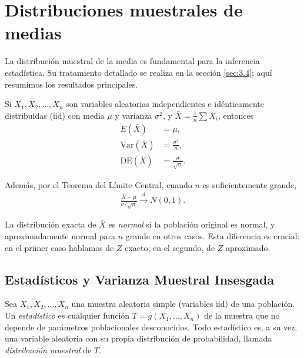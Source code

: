 \section{Distribuciones muestrales de medias}

La distribuci\'on muestral de la media es fundamental para la inferencia estad\'istica.
Su tratamiento detallado se realiza en la secci\'on \ref{sec:3.4}; aqu\'i resumimos
los resultados principales.

Si $X_1, X_2, \ldots, X_n$ son variables aleatorias independientes e id\'enticamente
distribuidas (iid) con media $\mu$ y varianza $\sigma^2$, y $\bar{X} = \frac{1}{n}\sum X_i$,
entonces
\begin{align}
 \label{eq:3.2.7}
 E(\bar{X}) &= \mu, \\
 \label{eq:3.2.8}
 \text{Var}(\bar{X}) &= \frac{\sigma^2}{n}, \\
 \label{eq:3.2.9}
 \text{DE}(\bar{X}) &= \frac{\sigma}{\sqrt{n}}.
\end{align}

Adem\'as, por el Teorema del L\'imite Central, cuando $n$ es suficientemente grande,
\begin{align}
 \label{eq:3.2.10}
 \frac{\bar{X} - \mu}{\sigma/\sqrt{n}} \xrightarrow{d} N(0,1).
\end{align}

\begin{observacion}
La distribuci\'on exacta de $\bar{X}$ es \emph{normal} si la poblaci\'on original es
normal, y aproximadamente normal para $n$ grande en otros casos. Esta diferencia es
crucial: en el primer caso hablamos de $Z$ exacto; en el segundo, de $Z$ aproximado.
\end{observacion}



\subsection{Estad\'isticos y Varianza Muestral Insesgada}

\begin{definicion}
Sea $X_1, X_2, \ldots, X_n$ una muestra aleatoria simple (variables iid) de una
poblaci\'on. Un \emph{estad\'istico} es cualquier funci\'on $T = g(X_1, \ldots, X_n)$
de la muestra que no depende de par\'ametros poblacionales desconocidos. Todo
estad\'istico es, a su vez, una variable aleatoria con su propia distribuci\'on de
probabilidad, llamada \emph{distribuci\'on muestral} de $T$.
\end{definicion}

